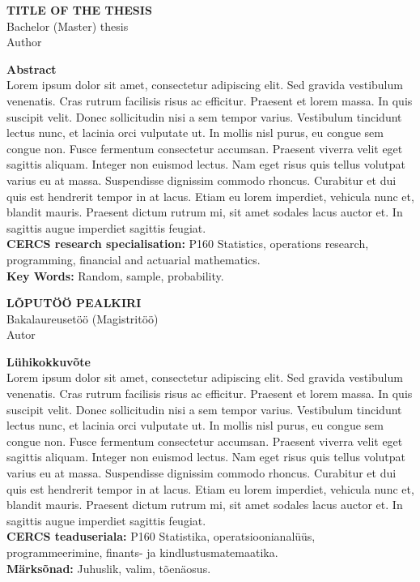 \small{

\begin{center}
\MakeUppercase{\textbf{Title of the Thesis}}\\
Bachelor (Master) thesis \\
Author\\
\end{center}

\normalsize{\textbf{Abstract}}\\
Lorem ipsum dolor sit amet, consectetur adipiscing elit. Sed gravida vestibulum venenatis. Cras rutrum facilisis risus ac efficitur. Praesent et lorem massa. In quis suscipit velit. Donec sollicitudin nisi a sem tempor varius. Vestibulum tincidunt lectus nunc, et lacinia orci vulputate ut. In mollis nisl purus, eu congue sem congue non. Fusce fermentum consectetur accumsan. Praesent viverra velit eget sagittis aliquam. Integer non euismod lectus. Nam eget risus quis tellus volutpat varius eu at massa. Suspendisse dignissim commodo rhoncus. Curabitur et dui quis est hendrerit tempor in at lacus. Etiam eu lorem imperdiet, vehicula nunc et, blandit mauris. Praesent dictum rutrum mi, sit amet sodales lacus auctor et. In sagittis augue imperdiet sagittis feugiat.\\
\textbf{CERCS research specialisation:} P160 Statistics, operations research, programming, financial
and actuarial mathematics.\\
\textbf{Key Words:} Random, sample, probability.\\
}

\vspace{0.5cm}

\small{

\begin{center}
\MakeUppercase{\textbf{Lõputöö pealkiri}}\\
Bakalaureusetöö (Magistritöö)\\
Autor\\
\end{center}

\normalsize{\textbf{Lühikokkuvõte}}\\
Lorem ipsum dolor sit amet, consectetur adipiscing elit. Sed gravida vestibulum venenatis. Cras rutrum facilisis risus ac efficitur. Praesent et lorem massa. In quis suscipit velit. Donec sollicitudin nisi a sem tempor varius. Vestibulum tincidunt lectus nunc, et lacinia orci vulputate ut. In mollis nisl purus, eu congue sem congue non. Fusce fermentum consectetur accumsan. Praesent viverra velit eget sagittis aliquam. Integer non euismod lectus. Nam eget risus quis tellus volutpat varius eu at massa. Suspendisse dignissim commodo rhoncus. Curabitur et dui quis est hendrerit tempor in at lacus. Etiam eu lorem imperdiet, vehicula nunc et, blandit mauris. Praesent dictum rutrum mi, sit amet sodales lacus auctor et. In sagittis augue imperdiet sagittis feugiat.\\
\textbf{CERCS teaduseriala:} P160 Statistika, operatsioonianalüüs, programmeerimine, finants- ja kindlustusmatemaatika.\\
\textbf{Märksõnad:} Juhuslik, valim, tõenäosus.\\
}